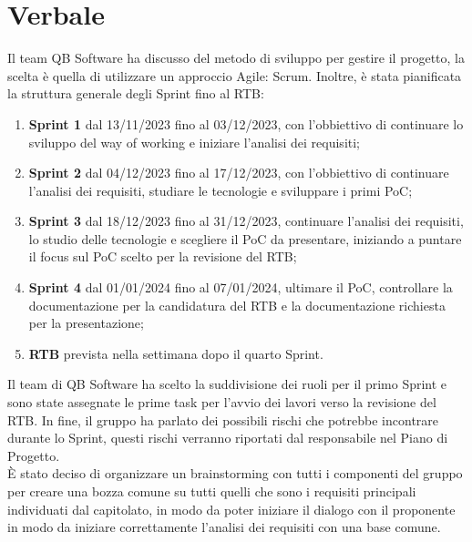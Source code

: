 \documentclass[12pt]{article}
\begin{document}
    \section{Verbale}
		Il team QB Software ha discusso del metodo di sviluppo per gestire il progetto, la scelta è quella di utilizzare un approccio Agile: Scrum. Inoltre, è stata pianificata la struttura generale degli Sprint fino al RTB:
		\begin{enumerate}
			\item \textbf{Sprint 1} dal 13/11/2023 fino al 03/12/2023, con l'obbiettivo di continuare lo sviluppo del way of working e iniziare l'analisi dei requisiti; 
			\item \textbf{Sprint 2} dal 04/12/2023 fino al 17/12/2023, con l'obbiettivo di continuare l'analisi dei requisiti, studiare le tecnologie e sviluppare i primi PoC;
			\item \textbf{Sprint 3} dal 18/12/2023 fino al 31/12/2023, continuare l'analisi dei requisiti, lo studio delle tecnologie e scegliere il PoC da presentare, iniziando a puntare il focus sul PoC scelto per la revisione del RTB;
			\item \textbf{Sprint 4} dal 01/01/2024 fino al 07/01/2024, ultimare il PoC, controllare la documentazione per la candidatura del RTB e la documentazione richiesta per la presentazione;
			\item \textbf{RTB} prevista nella settimana dopo il quarto Sprint.
		\end{enumerate}
		\noindent
		Il team di QB Software ha scelto la suddivisione dei ruoli per il primo Sprint e sono state assegnate le prime task per l'avvio dei lavori verso la revisione del RTB. In fine, il gruppo ha parlato dei possibili rischi che potrebbe incontrare durante lo Sprint, questi rischi verranno riportati dal responsabile nel Piano di Progetto.
		\\
		È stato deciso di organizzare un brainstorming con tutti i componenti del gruppo per creare una bozza comune su tutti quelli che sono i requisiti principali individuati dal capitolato, in modo da poter iniziare il dialogo con il proponente in modo da iniziare correttamente l'analisi dei requisiti con una base comune.
		
\end{document}
